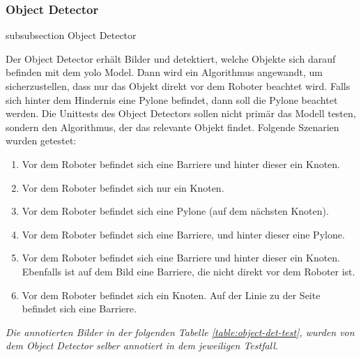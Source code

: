 \newpage
\subsubsection*{Object Detector}\label{object-detector-unittests}
{subsubsection}
{Object Detector}

Der Object Detector erhält Bilder und detektiert, welche Objekte sich darauf befinden mit dem \gls{yolo} Model. Dann wird ein Algorithmus angewandt, um sicherzustellen, dass nur das Objekt direkt vor dem Roboter beachtet wird. Falls sich hinter dem Hindernis eine Pylone befindet, dann soll die Pylone beachtet werden.
Die Unittests des Object Detectors sollen nicht primär das Modell testen, sondern den Algorithmus, der das relevante Objekt findet. Folgende Szenarien wurden getestet:

\begin{enumerate}
    \item Vor dem Roboter befindet sich eine Barriere und hinter dieser ein Knoten.
    \item Vor dem Roboter befindet sich nur ein Knoten.
    \item Vor dem Roboter befindet sich eine Pylone (auf dem nächsten Knoten).
    \item Vor dem Roboter befindet sich eine Barriere, und hinter dieser eine Pylone.
    \item Vor dem Roboter befindet sich eine Barriere und hinter dieser ein Knoten. Ebenfalls ist auf dem Bild eine Barriere, die nicht direkt vor dem Roboter ist.
    \item Vor dem Roboter befindet sich ein Knoten. Auf der Linie zu der Seite befindet sich eine Barriere.
\end{enumerate}

\textit{Die annotierten Bilder in der folgenden Tabelle \ref{table:object-det-test}, wurden von dem Object Detector selber annotiert in dem jeweiligen Testfall.}

